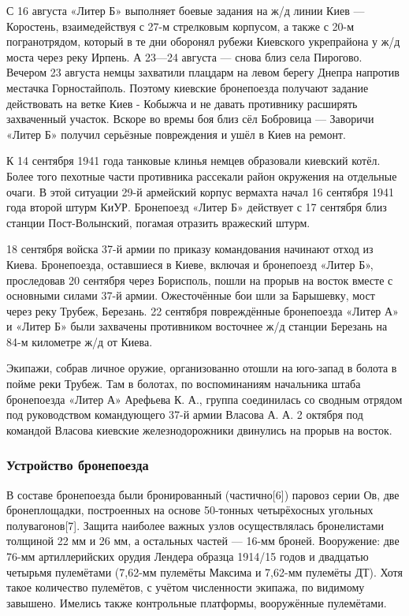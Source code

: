 \begin{multicols}{3}
С 16 августа «Литер Б» выполняет боевые задания на ж/д линии Киев — Коростень,
взаимедействуя с 27-м стрелковым корпусом, а также с 20-м погранотрядом,
который в те дни оборонял рубежи Киевского укрепрайона у ж/д моста через реку
Ирпень. А 23—24 августа — снова близ села Пирогово. Вечером 23 августа немцы
захватили плацдарм на левом берегу Днепра напротив местачка Горностайполь.
Поэтому киевские бронепоезда получают задание действовать на ветке Киев -
Кобыжча и не давать противнику расширять захваченный участок. Вскоре во времы
боя близ сёл Бобровица — Заворичи «Литер Б» получил серьёзные повреждения и
ушёл в Киев на ремонт\cite{Kajnaran2012}.

К 14 сентября 1941 года танковые клинья немцев образовали киевский котёл. Более
того пехотные части противника рассекали район окружения на отдельные очаги. В
этой ситуации 29-й армейский корпус вермахта начал 16 сентября 1941 года второй
штурм КиУР\cite{KajnaranMuravovJuschenko2017}. Бронепоезд «Литер Б» действует с
17 сентября близ станции Пост-Волынский, погамая отразить вражеский
штурм\cite{Kajnaran2012}.

18 сентября войска 37-й армии по приказу командования начинают отход из
Киева\cite{KajnaranMuravovJuschenko2017}. Бронепоезда, оставшиеся в Киеве,
включая и бронепоезд «Литер Б», проследовав 20 сентября через Борисполь, пошли
на прорыв на восток вместе с основными силами 37-й армии\cite{Kajnaran2012}.
Ожесточённые бои шли за Барышевку, мост через реку Трубеж, Березань. 22
сентября повреждённые бронепоезда «Литер А» и «Литер Б» были захвачены
противником восточнее ж/д станции Березань на 84-м километре ж/д от
Киева\cite{Kajnaran2012}.

Экипажи, собрав личное оружие, организованно отошли на юго-запад в болота в
пойме реки Трубеж. Там в болотах, по воспоминаниям начальника штаба бронепоезда
«Литер А» Арефьева К. А., группа соединилась со сводным отрядом под
руководством командующего 37-й армии Власова А. А. 2 октября под командой
Власова киевские железнодорожники двинулись на прорыв на
восток\cite{Kajnaran2012}. 

\subsubsection{Устройство бронепоезда}

В составе бронепоезда были бронированный (частично[6]) паровоз серии Ов, две
бронеплощадки, построенных на основе 50-тонных четырёхосных угольных
полувагонов[7]. Защита наиболее важных узлов осуществлялась бронелистами
толщиной 22 мм и 26 мм, а остальных частей — 16-мм броней. Вооружение: две
76-мм артиллерийских орудия Лендера образца 1914/15 годов и двадцатью четырьмя
пулемётами (7,62-мм пулемёты Максима и 7,62-мм пулемёты ДТ). Хотя такое
количество пулемётов, с учётом численности экипажа, по видимому завышено.
Имелись также контрольные платформы, вооружённые пулемётами\cite{Kajnaran2012}.


\end{multicols}
